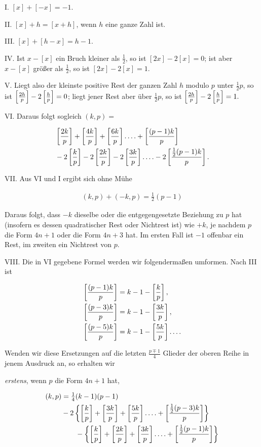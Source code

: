 I. $[x]+[-x]=-1.$

II. $[x]+h=[x+h]$, wenn $h$ eine ganze Zahl ist.

III. $[x]+[h-x]=h-1.$

IV. Ist $x-[x]$ ein Bruch kleiner als $\tfrac12$, so ist $[2x]-2[x]=0$; ist aber $x-[x]$ größer als $\tfrac12$, so ist $[2x]-2[x]=1.$

V. Liegt also der kleinste positive Rest der ganzen Zahl $h$ modulo $p$ unter $\tfrac12p$, so ist $\left[\frac{2h}{p}\right]-2\left[\frac{h}{p}\right]=0$; liegt jener Rest aber über $\tfrac12p$, so ist \mbox{$\left[\frac{2h}{p}\right]-2\left[\frac{h}{p}\right]=1.$}

VI. Daraus folgt sogleich $(k,p)=$

\[
\begin{aligned}
&\left[\frac{2k}{p}\right]+\left[\frac{4k}{p}\right]+\left[\frac{6k}{p}\right]\mathinner{.\,.\,.\,.}+\left[\frac{(p-1)k}{p}\right]\\
&-2\left[\frac{k}{p}\right]-2\left[\frac{2k}{p}\right]-2\left[\frac{3k}{p}\right]\mathinner{.\,.\,.\,.}-2\left[\frac{\frac12(p-1)k}{p}\right].
\end{aligned}
\]

VII. Aus VI und I ergibt sich ohne Mühe

\[
\begin{aligned}
(k,p)+(-k,p)=\tfrac12(p-1)
\end{aligned}
\]

Daraus folgt, dass $-k$ dieselbe oder die entgegengesetzte Beziehung zu $p$ hat (insofern es dessen quadratischer Rest oder Nichtrest ist) wie $+k$, je nachdem $p$ die Form $4n+1$ oder die Form $4n+3$ hat. Im ersten Fall ist $-1$ offenbar ein Rest, im zweiten ein Nichtrest von $p$.

VIII. Die in VI gegebene Formel werden wir folgendermaßen umformen. Nach III ist

\[
\begin{aligned}
\left[\frac{(p-1)k}{p}\right]&=k-1-\left[\frac{k}{p}\right],\\
\left[\frac{(p-3)k}{p}\right]&=k-1-\left[\frac{3k}{p}\right],\\
\left[\frac{(p-5)k}{p}\right]&=k-1-\left[\frac{5k}{p}\right]\mathinner{.\,.\,.\,.}
\end{aligned}
\]

Wenden wir diese Ersetzungen auf die letzten $\frac{p\mp1}{4}$ Glieder der oberen Reihe in jenem Ausdruck an, so erhalten wir

\emph{erstens}, wenn $p$ die Form $4n+1$ hat,

\[
\begin{aligned}
(k,p)&=\tfrac14(k-1)(p-1)\\
& -2\left\{\left[\frac{k}{p}\right]+\left[\frac{3k}{p}\right]+\left[\frac{5k}{p}\right]\mathinner{.\,.\,.\,.}+\left[\frac{\frac12(p-3)k}{p}\right]\right\}\\
&\qquad-\left\{\left[\frac{k}{p}\right]+\left[\frac{2k}{p}\right]+\left[\frac{3k}{p}\right]\mathinner{.\,.\,.\,.}+\left[\frac{\frac12(p-1)k}{p}\right]\right\}
\end{aligned}
\]

